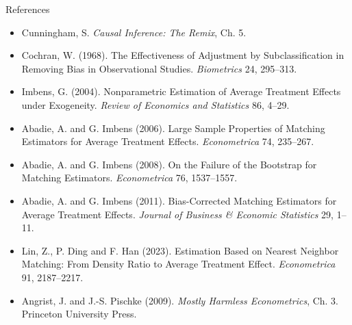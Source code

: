 \documentclass[
  11pt,
  ignorenonframetext,
  aspectratio=169,
]{beamer}
\providecommand{\tightlist}{%
  \setlength{\itemsep}{0pt}\setlength{\parskip}{0pt}}
\begin{document}
\begin{frame}{References}
\protect{}\label{references}
\scriptsize

\begin{itemize}
\tightlist
\item
  Cunningham, S. \emph{Causal Inference: The Remix}, Ch. 5.
\item
  Cochran, W. (1968). The Effectiveness of Adjustment by
  Subclassification in Removing Bias in Observational Studies.
  \emph{Biometrics} 24, 295--313.
\item
  Imbens, G. (2004). Nonparametric Estimation of Average Treatment
  Effects under Exogeneity. \emph{Review of Economics and Statistics}
  86, 4--29.
\item
  Abadie, A. and G. Imbens (2006). Large Sample Properties of Matching
  Estimators for Average Treatment Effects. \emph{Econometrica} 74,
  235--267.
\item
  Abadie, A. and G. Imbens (2008). On the Failure of the Bootstrap for
  Matching Estimators. \emph{Econometrica} 76, 1537--1557.
\item
  Abadie, A. and G. Imbens (2011). Bias-Corrected Matching Estimators
  for Average Treatment Effects. \emph{Journal of Business \& Economic
  Statistics} 29, 1--11.
\item
  Lin, Z., P. Ding and F. Han (2023). Estimation Based on Nearest
  Neighbor Matching: From Density Ratio to Average Treatment Effect.
  \emph{Econometrica} 91, 2187--2217.
\item
  Angrist, J. and J.-S. Pischke (2009). \emph{Mostly Harmless
  Econometrics}, Ch. 3. Princeton University Press.
\end{itemize}
\end{frame}
\end{document}
